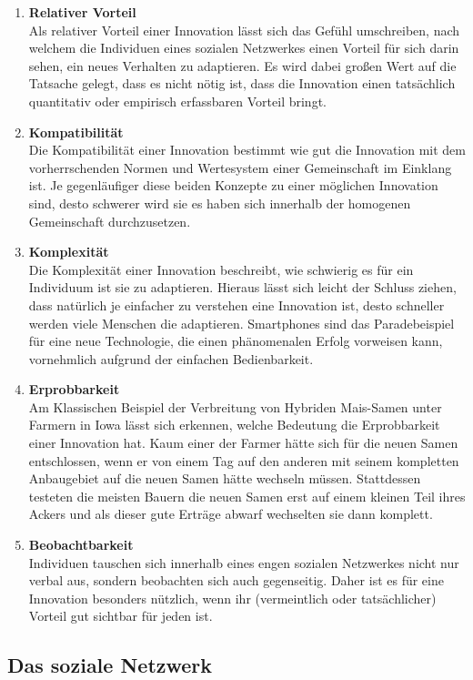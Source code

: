 \documentclass[12pt]{article}
\begin{document}
\begin{enumerate}
\item \textbf{Relativer Vorteil}\\ Als relativer Vorteil einer Innovation lässt sich das Gefühl umschreiben, nach welchem die Individuen eines sozialen Netzwerkes einen Vorteil für sich darin sehen, ein neues Verhalten zu adaptieren. Es wird dabei großen Wert auf die Tatsache gelegt, dass es nicht nötig ist, dass die Innovation einen tatsächlich quantitativ oder empirisch erfassbaren Vorteil bringt.
\item \textbf{Kompatibilität}\\ Die Kompatibilität einer Innovation bestimmt wie gut die Innovation mit dem vorherrschenden Normen und Wertesystem einer Gemeinschaft im Einklang ist. Je gegenläufiger diese beiden Konzepte zu einer möglichen Innovation sind, desto schwerer wird sie es haben sich innerhalb der homogenen Gemeinschaft durchzusetzen.
\item \textbf{Komplexität}\\ Die Komplexität einer Innovation beschreibt, wie schwierig es für ein Individuum ist sie zu adaptieren. Hieraus lässt sich leicht der Schluss ziehen, dass natürlich je einfacher zu verstehen eine Innovation ist, desto schneller werden viele Menschen die adaptieren. Smartphones sind das Paradebeispiel für eine neue Technologie, die einen phänomenalen Erfolg vorweisen kann, vornehmlich aufgrund der einfachen Bedienbarkeit.
\item \textbf{Erprobbarkeit} \\ Am Klassischen Beispiel der Verbreitung von Hybriden Mais-Samen unter Farmern in Iowa lässt sich erkennen, welche Bedeutung die Erprobbarkeit einer Innovation hat. Kaum einer der Farmer hätte sich für die neuen Samen entschlossen, wenn er von einem Tag auf den anderen mit seinem kompletten Anbaugebiet auf die neuen Samen hätte wechseln müssen. Stattdessen testeten die meisten Bauern die neuen Samen erst auf einem kleinen Teil ihres Ackers und als dieser gute Erträge abwarf wechselten sie dann komplett.
\item \textbf{Beobachtbarkeit} \\ Individuen tauschen sich innerhalb eines engen sozialen Netzwerkes nicht nur verbal aus, sondern beobachten sich auch gegenseitig. Daher ist es für eine Innovation besonders nützlich, wenn ihr (vermeintlich oder tatsächlicher) Vorteil gut sichtbar für jeden ist.
\end{enumerate}
\subsection{Das soziale Netzwerk}
\end{document}
